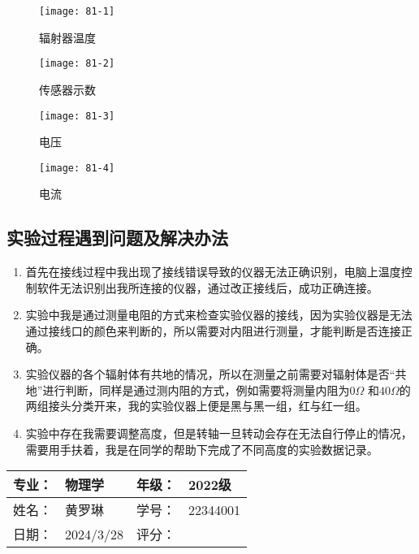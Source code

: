 \documentclass[dvipsnames, svgnames,a4paper,11pt]{article}
\begin{document}
\begin{figure}[H]
    \centering
    \begin{minipage}[b]{0.23\linewidth}
        \centering
        \texttt{[image: 81-1]}
        \caption{辐射器温度}
    \end{minipage}
    \hfill
    \begin{minipage}[b]{0.23\linewidth}
        \centering
        \texttt{[image: 81-2]}
        \caption{传感器示数}
    \end{minipage}
    \hfill
    \begin{minipage}[b]{0.23\linewidth}
        \centering
        \texttt{[image: 81-3]}
        \caption{电压}
    \end{minipage}
    \hfill
    \begin{minipage}[b]{0.23\linewidth}
        \centering
        \texttt{[image: 81-4]}
        \caption{电流}
    \end{minipage}
\end{figure}

	\subsection{实验过程遇到问题及解决办法}
	\begin{enumerate}
		\item 首先在接线过程中我出现了接线错误导致的仪器无法正确识别，电脑上温度控制软件无法识别出我所连接的仪器，通过改正接线后，成功正确连接。
		\item 实验中我是通过测量电阻的方式来检查实验仪器的接线，因为实验仪器是无法通过接线口的颜色来判断的，所以需要对内阻进行测量，才能判断是否连接正确。
		\item 实验仪器的各个辐射体有共地的情况，所以在测量之前需要对辐射体是否“共地”进行判断，同样是通过测内阻的方式，例如需要将测量内阻为$0\Omega$ 和$40\Omega$的两组接头分类开来，我的实验仪器上便是黑与黑一组，红与红一组。
		\item 实验中存在我需要调整高度，但是转轴一旦转动会存在无法自行停止的情况，需要用手扶着，我是在同学的帮助下完成了不同高度的实验数据记录。
	\end{enumerate}
	
	
	
	\clearpage
	
	\begin{table}
		\renewcommand\arraystretch{1.7}
		\begin{tabularx}{\textwidth}{|X|X|X|X|}
			\hline
			专业：& 物理学 &年级：& 2022级\\
			\hline
			姓名： & 黄罗琳 & 学号：& 22344001\\
			\hline
			日期：& 2024/3/28 & 评分： &\\
			\hline
		\end{tabularx}
	\end{table}
	
\end{document}
